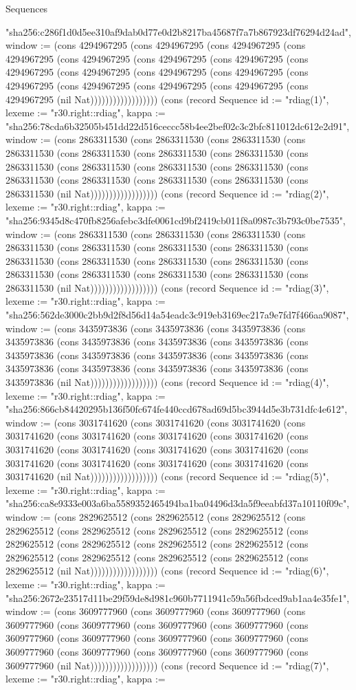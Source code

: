 \begin{lexlean}{Sequences}
\begin{semanticmodule}
{"sha256:c286f1d0d5ee310af9dab0d77e0d2b8217ba45687f7a7b867923df76294d24ad", window := (cons 4294967295 (cons 4294967295 (cons 4294967295 (cons 4294967295 (cons 4294967295 (cons 4294967295 (cons 4294967295 (cons 4294967295 (cons 4294967295 (cons 4294967295 (cons 4294967295 (cons 4294967295 (cons 4294967295 (cons 4294967295 (cons 4294967295 (cons 4294967295 (nil Nat)))))))))))))))))}) (cons (record Sequence {id := "rdiag(1)", lexeme := "r30.right::rdiag", kappa := "sha256:78cda6b32505b451dd22d516ceccc58b4ee2bef02c3c2bfc811012dc612e2d91", window := (cons 2863311530 (cons 2863311530 (cons 2863311530 (cons 2863311530 (cons 2863311530 (cons 2863311530 (cons 2863311530 (cons 2863311530 (cons 2863311530 (cons 2863311530 (cons 2863311530 (cons 2863311530 (cons 2863311530 (cons 2863311530 (cons 2863311530 (cons 2863311530 (nil Nat)))))))))))))))))}) (cons (record Sequence {id := "rdiag(2)", lexeme := "r30.right::rdiag", kappa := "sha256:9345d8c470fb8256afebc3dfe0061cd9bf2419cb011f8a0987c3b793c0be7535", window := (cons 2863311530 (cons 2863311530 (cons 2863311530 (cons 2863311530 (cons 2863311530 (cons 2863311530 (cons 2863311530 (cons 2863311530 (cons 2863311530 (cons 2863311530 (cons 2863311530 (cons 2863311530 (cons 2863311530 (cons 2863311530 (cons 2863311530 (cons 2863311530 (nil Nat)))))))))))))))))}) (cons (record Sequence {id := "rdiag(3)", lexeme := "r30.right::rdiag", kappa := "sha256:562de3000c2bb9d2f8d56d14a54eadc3c919eb3169ec217a9e7fd7f466aa9087", window := (cons 3435973836 (cons 3435973836 (cons 3435973836 (cons 3435973836 (cons 3435973836 (cons 3435973836 (cons 3435973836 (cons 3435973836 (cons 3435973836 (cons 3435973836 (cons 3435973836 (cons 3435973836 (cons 3435973836 (cons 3435973836 (cons 3435973836 (cons 3435973836 (nil Nat)))))))))))))))))}) (cons (record Sequence {id := "rdiag(4)", lexeme := "r30.right::rdiag", kappa := "sha256:866cb84420295b136f50fc674fe440ccd678ad69d5bc3944d5e3b731dfc4e612", window := (cons 3031741620 (cons 3031741620 (cons 3031741620 (cons 3031741620 (cons 3031741620 (cons 3031741620 (cons 3031741620 (cons 3031741620 (cons 3031741620 (cons 3031741620 (cons 3031741620 (cons 3031741620 (cons 3031741620 (cons 3031741620 (cons 3031741620 (cons 3031741620 (nil Nat)))))))))))))))))}) (cons (record Sequence {id := "rdiag(5)", lexeme := "r30.right::rdiag", kappa := "sha256:ca8e9333e003a6ba5589352465494ba1ba04496d3da5f9eeabfd37a10110f09c", window := (cons 2829625512 (cons 2829625512 (cons 2829625512 (cons 2829625512 (cons 2829625512 (cons 2829625512 (cons 2829625512 (cons 2829625512 (cons 2829625512 (cons 2829625512 (cons 2829625512 (cons 2829625512 (cons 2829625512 (cons 2829625512 (cons 2829625512 (cons 2829625512 (nil Nat)))))))))))))))))}) (cons (record Sequence {id := "rdiag(6)", lexeme := "r30.right::rdiag", kappa := "sha256:2672e23517d11be29f59de8d981c960b7711941c59a56fbdced9ab1aa4e35fe1", window := (cons 3609777960 (cons 3609777960 (cons 3609777960 (cons 3609777960 (cons 3609777960 (cons 3609777960 (cons 3609777960 (cons 3609777960 (cons 3609777960 (cons 3609777960 (cons 3609777960 (cons 3609777960 (cons 3609777960 (cons 3609777960 (cons 3609777960 (cons 3609777960 (nil Nat)))))))))))))))))}) (cons (record Sequence {id := "rdiag(7)", lexeme := "r30.right::rdiag", kappa := }
\end{semanticmodule}
\end{lexlean}
